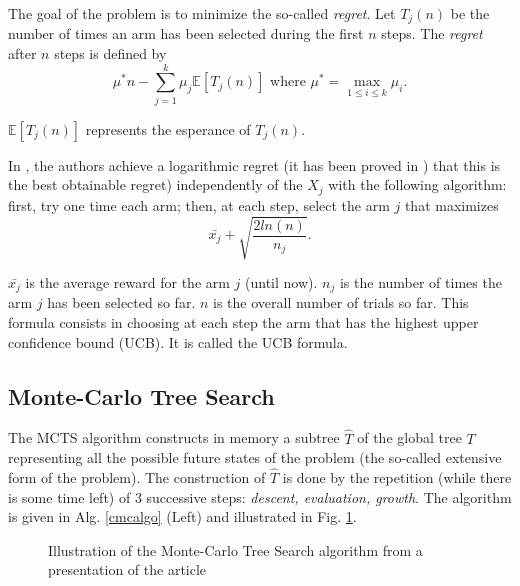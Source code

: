 \documentclass{llncs}
\begin{document}
The goal of the problem is to minimize the so-called {\em{regret}}.
Let $T_j(n)$ be the number of times an arm has been selected during the first $n$ steps.
The {\em{regret}} after $n$ steps is defined by
$$ \mu^* n - \sum_{j=1}^{k}{\mu_j  \mathbb{E}[T_j(n)]}  \textrm{ where }  \mu^*=\max_{1 \le i \le k} \mu_i. $$

 $\mathbb{E}[T_j(n)]$ represents the esperance of $T_j(n)$.

In \cite{auer}, the authors achieve a logarithmic regret (it has been proved  in \cite{lairobbins}) that this is the best obtainable regret) independently of the $X_j$ with the following algorithm: first, try one time each arm; then, at each step, select the arm $j$ that maximizes
\begin{equation}
\bar{x_j} + \sqrt{\frac{2ln(n)}{n_j}}.
\label{ucb}
\end{equation}

$\bar{x_j}$ is the average reward for the arm $j$ (until now). $n_j$ is the number of times the arm $j$ has been selected so far. $n$ is the overall number of trials so far.
This formula consists in choosing at each step the arm that has the highest upper confidence bound (UCB). It is called the UCB formula.


\subsection{Monte-Carlo Tree Search}\label{mct}

The MCTS algorithm constructs in memory a subtree $\hat{T}$ of the global tree $T$ representing all the possible future states of the problem (the so-called extensive form of the problem).
The construction of $\hat T$ is done by the repetition (while there is some time left) of 3 successive steps: {\em{descent, evaluation, growth}}.
The algorithm is given in Alg. \ref{cmcalgo} (Left)  and illustrated in Fig. \ref{uctfig}.
\begin{figure}[htb]
\begin{center}
\end{center}
\caption{\label{uctfig} Illustration of the Monte-Carlo Tree Search algorithm from a presentation of the article \cite{icmlmogo}}
\end{figure}
\end{document}
